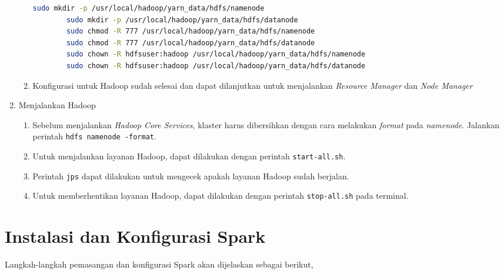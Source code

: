 \begin{enumerate}
\begin{enumerate}
\begin{lstlisting}[language=bash]
		sudo mkdir -p /usr/local/hadoop/yarn_data/hdfs/namenode
		sudo mkdir -p /usr/local/hadoop/yarn_data/hdfs/datanode
		sudo chmod -R 777 /usr/local/hadoop/yarn_data/hdfs/namenode
		sudo chmod -R 777 /usr/local/hadoop/yarn_data/hdfs/datanode
		sudo chown -R hdfsuser:hadoop /usr/local/hadoop/yarn_data/hdfs/namenode
		sudo chown -R hdfsuser:hadoop /usr/local/hadoop/yarn_data/hdfs/datanode
      \end{lstlisting}
    \item Konfigurasi untuk Hadoop sudah selesai dan dapat dilanjutkan untuk menjalankan \textit{Resource Manager} dan \textit{Node Manager}
  \end{enumerate}
  \item Menjalankan Hadoop
  \begin{enumerate}
    \item Sebelum menjalankan \textit{Hadoop Core Services}, klaster harus dibersihkan dengan cara melakukan \textit{format} pada \textit{namenode}. Jalankan perintah \verb|hdfs namenode -format|.
    \item Untuk menjalankan layanan Hadoop, dapat dilakukan dengan perintah \verb|start-all.sh|.
    \item Perintah \verb|jps| dapat dilakukan untuk mengecek apakah layanan Hadoop sudah berjalan.
    \item Untuk memberhentikan layanan Hadoop, dapat dilakukan dengan perintah \verb|stop-all.sh| pada terminal.
  \end{enumerate}
\end{enumerate}



\chapter{Instalasi dan Konfigurasi Spark}
\label{appendix:D}

Langkah-langkah pemasangan dan konfigurasi Spark akan dijelaskan sebagai berikut,

